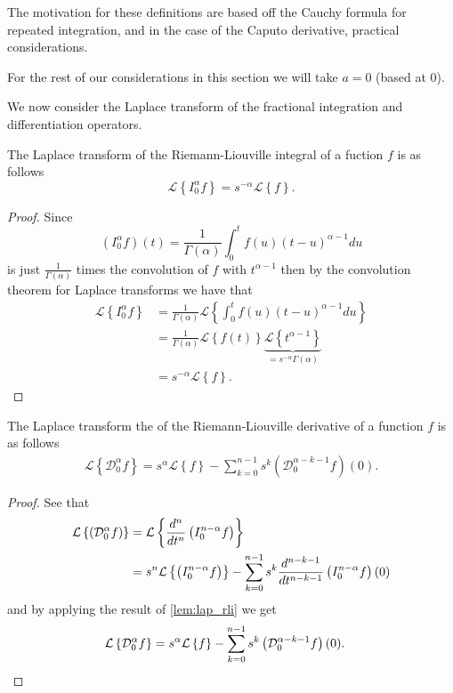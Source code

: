 \documentclass{unswmaths}
\begin{document}
The motivation for these definitions are based off the Cauchy formula for repeated integration, and in the case
of the Caputo derivative, practical considerations. \cite{Samko1993, Podlubny1999} 

For the rest of our considerations in this section we will take $ a = 0 $ (based at 0). 

We now consider the Laplace transform of the fractional integration and differentiation operators.

\begin{lemma}
\label{lem:lap_rli}
	The Laplace transform of the Riemann-Liouville integral of a fuction $ f $ is as follows
	$$
		\mathcal{L} \left\{ I_0^\alpha f \right\}  = s^{-\alpha} \mathcal{L} \left\{ f \right\}.
	$$
\end{lemma}
\begin{proof}
	Since 
	$$
		 (I_0^\alpha f)(t) = \frac{1}{\Gamma(\alpha)} \int_0^t f(u) (t-u)^{\alpha - 1} du
	$$
	is just $ \frac{1}{\Gamma(\alpha)} $ times the convolution of $ f $ with $ t^{\alpha - 1} $ then by the convolution theorem
	for Laplace transforms we have that 
	\begin{align*}
		\mathcal{L} \left\{ I_0^\alpha f \right\} &= \frac{1}{\Gamma(\alpha)} \mathcal{L} \left\{ \int_{0}^{t} f(u) (t-u)^{\alpha - 1} du \right\} \\
			&= \frac{1}{\Gamma(\alpha)} \mathcal{L} \left\{ f(t) \right\} \underbrace{\mathcal{L} \left\{ t^{\alpha - 1} \right\}}_{=s^{-\alpha} \Gamma(\alpha)} \\
			&= s^{-\alpha} \mathcal{L} \left\{ f \right\}.
	\end{align*}
\end{proof}

\begin{lemma}
\label{lem:lap_rld}
	The Laplace transform the of the Riemann-Liouville derivative of a function $ f $ is as follows
	\begin{align*}
		\mathcal{L} \left\{\mathcal{D}_0^\alpha f\right\} = s^\alpha \mathcal{L} \left\{ f \right\} - \sum_{k=0}^{n-1} s^{k} \left( \mathcal{D}_0^{\alpha-k-1} f\right)(0).
	\end{align*}
\end{lemma}
\begin{proof}
	See that
	\begin{align*}
		\mathcal{L} \left\{  \left( \mathcal{D}_{0}^{\alpha} f \right)  \right\} &= \mathcal{L} \left\{  \frac{d^{n}}{dt^{n}} \left( I_{0}^{n-\alpha} f \right)  \right\} \\
			&= s^n\mathcal{L} \left\{ \left( I_{0}^{n-\alpha} f \right) \right\} - \sum_{k=0}^{n-1} s^k \frac{d^{n-k-1}}{dt^{n-k-1}} \left( I_{0}^{n-\alpha} f \right)(0)
	\end{align*}
	and by applying the result of \ref{lem:lap_rli} we get
	\begin{align*}
			\mathcal{L} \left\{\mathcal{D}_0^\alpha f\right\} &= s^\alpha \mathcal{L} \left\{ f \right\} - \sum_{k=0}^{n-1} s^{k} \left( \mathcal{D}_{0}^{\alpha - k - 1} f \right)(0). 
	\end{align*}
\end{proof}
\end{document}
